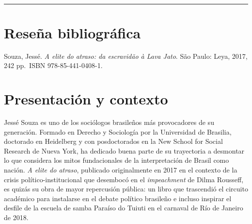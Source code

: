 \documentclass{article}
\renewcommand{\normalsize}{\fontsize{10pt}{13pt}\selectfont}
\renewenvironment{quote}{\normalsize\list{}{\sf\leftmargin=14pt\rightmargin=0pt}\item\relax}{\endlist}
\begin{document}
\begin{textblock*}{68mm}
{\begin{minipage}[t]{68mm}
{\href{https://www.linkedin.com/sharing/share-offsite/?url=https%3A%2F%2Fjuridica.ibero.mx%2Findex.php%2Fjuridi%2Farticle%2Fview%2F307%2F237}{}~
\href{https://www.reddit.com/submit?url=https%3A%2F%2Fjuridica.ibero.mx%2Findex.php%2Fjuridi%2Farticle%2Fview%2F307%2F237&title=Rese%C3%B1a%20editorial}{}~
\href{https://www.researchgate.net/search?q=Rese%C3%B1a%20editorial}{}~
\href{https://t.me/share/url?url=https%3A%2F%2Fjuridica.ibero.mx%2Findex.php%2Fjuridi%2Farticle%2Fview%2F307%2F237&text=Rese%C3%B1a%20editorial}{}~
\href{https://wa.me/?text=https%3A%2F%2Fjuridica.ibero.mx%2Findex.php%2Fjuridi%2Farticle%2Fview%2F307%2F237}{}~
\href{https://twitter.com/intent/tweet?url=https%3A%2F%2Fjuridica.ibero.mx%2Findex.php%2Fjuridi%2Farticle%2Fview%2F307%2F237&text=Rese%C3%B1a%20editorial}{}
}\par
\end{minipage}%
}%
\end{textblock*}


\bigskip
\noindent\rule{\linewidth}{0.4pt}
\bigskip

\section{Reseña bibliográfica}

\begin{quote}
Souza, Jessé. \textit{A elite do atraso: da escravidão à Lava Jato}. São Paulo: Leya, 2017, 242 pp. ISBN 978-85-441-0408-1.

\end{quote}


\section{Presentación y contexto}
Jessé Souza es uno de los sociólogos brasileños más provocadores de su generación. Formado en Derecho y Sociología por la Universidad de Brasilia, doctorado en Heidelberg y con posdoctorados en la New School for Social Research de Nueva York, ha dedicado buena parte de su trayectoria a desmontar lo que considera los mitos fundacionales de la interpretación de Brasil como nación. \textit{A elite do atraso}, publicado originalmente en 2017 en el contexto de la crisis político-institucional que desembocó en el \textit{impeachment} de Dilma Rousseff, es quizás su obra de mayor repercusión pública: un libro que trascendió el circuito académico para instalarse en el debate político brasileño e incluso inspirar el desfile de la escuela de samba Paraíso do Tuiuti en el carnaval de Río de Janeiro de 2018.
\end{document}
